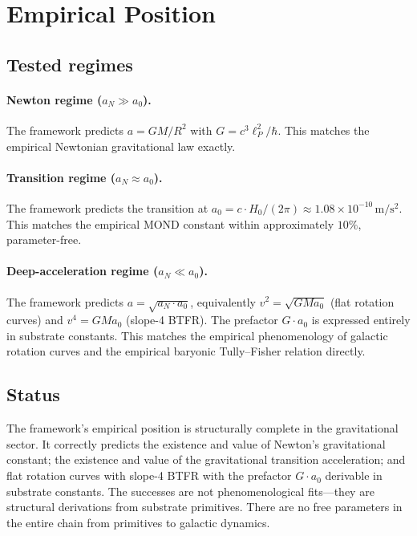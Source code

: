 \documentclass[11pt,a4paper]{article}
\begin{document}
\section{Empirical Position}\label{sec:empirical}

\subsection{Tested regimes}

\paragraph{Newton regime ($a_N \gg a_0$).} The framework predicts $a = GM/R^2$ with $G = c^3\ell_P^2/\hbar$. This matches the empirical Newtonian gravitational law exactly.

\paragraph{Transition regime ($a_N \approx a_0$).} The framework predicts the transition at $a_0 = c\cdot H_0/(2\pi) \approx 1.08\times 10^{-10}\,\mathrm{m/s^2}$. This matches the empirical MOND constant within approximately $10\%$, parameter-free.

\paragraph{Deep-acceleration regime ($a_N \ll a_0$).} The framework predicts $a = \sqrt{a_N \cdot a_0}$, equivalently $v^2 = \sqrt{G M a_0}$ (flat rotation curves) and $v^4 = G M a_0$ (slope-4 BTFR). The prefactor $G\cdot a_0$ is expressed entirely in substrate constants. This matches the empirical phenomenology of galactic rotation curves and the empirical baryonic Tully--Fisher relation directly.

\subsection{Status}

The framework's empirical position is structurally complete in the gravitational sector. It correctly predicts the existence and value of Newton's gravitational constant; the existence and value of the gravitational transition acceleration; and flat rotation curves with slope-4 BTFR with the prefactor $G\cdot a_0$ derivable in substrate constants. The successes are not phenomenological fits---they are structural derivations from substrate primitives. There are no free parameters in the entire chain from primitives to galactic dynamics.
\end{document}
